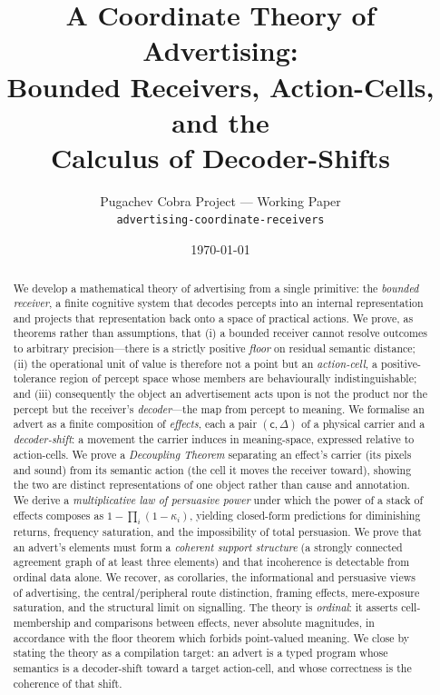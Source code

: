\documentclass[twocolumn,11pt,a4paper]{article}
\title{\bfseries A Coordinate Theory of Advertising:\\
Bounded Receivers, Action-Cells, and the\\
Calculus of Decoder-Shifts}
\author{%
  \normalsize Pugachev Cobra Project --- Working Paper\\
  \small \texttt{advertising-coordinate-receivers}
}
\date{\today}
\theoremstyle{adv}
\theoremstyle{definition}
\theoremstyle{remark}
\newcommand{\Carrier}{\kappa}         %
\renewcommand{\Carrier}{\mathsf{c}}
\newcommand{\shift}{\Delta}            %
\newcommand{\pot}{\kappa}             %
\begin{document}
\maketitle

\begin{abstract}
\noindent
We develop a mathematical theory of advertising from a single primitive:
the \emph{bounded receiver}, a finite cognitive system that decodes
percepts into an internal representation and projects that representation
back onto a space of practical actions. We prove, as theorems rather than
assumptions, that (i) a bounded receiver cannot resolve outcomes to
arbitrary precision---there is a strictly positive \emph{floor} on
residual semantic distance; (ii) the operational unit of value is
therefore not a point but an \emph{action-cell}, a positive-tolerance
region of percept space whose members are behaviourally
indistinguishable; and (iii) consequently the object an advertisement
acts upon is not the product nor the percept but the receiver's
\emph{decoder}---the map from percept to meaning. We formalise an advert
as a finite composition of \emph{effects}, each a pair $(\Carrier,\shift)$
of a physical carrier and a \emph{decoder-shift}: a movement the carrier
induces in meaning-space, expressed relative to action-cells. We prove a
\emph{Decoupling Theorem} separating an effect's carrier (its pixels and
sound) from its semantic action (the cell it moves the receiver toward),
showing the two are distinct representations of one object rather than
cause and annotation. We derive a \emph{multiplicative law of persuasive
power} under which the power of a stack of effects composes as
$1-\prod_i(1-\pot_i)$, yielding closed-form predictions for diminishing
returns, frequency saturation, and the impossibility of total persuasion.
We prove that an advert's elements must form a \emph{coherent support
structure} (a strongly connected agreement graph of at least three
elements) and that incoherence is detectable from ordinal data alone. We
recover, as corollaries, the informational and persuasive views of
advertising, the central/peripheral route distinction, framing effects,
mere-exposure saturation, and the structural limit on signalling. The
theory is \emph{ordinal}: it asserts cell-membership and comparisons
between effects, never absolute magnitudes, in accordance with the floor
theorem which forbids point-valued meaning. We close by stating the
theory as a compilation target: an advert is a typed program whose
semantics is a decoder-shift toward a target action-cell, and whose
correctness is the coherence of that shift.
\end{abstract}
\end{document}
